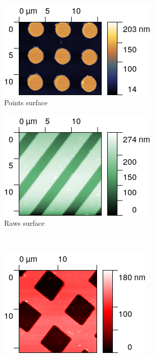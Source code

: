 \documentclass[11pt,a4paper]{article}
\begin{document}
\begin{figure}[H]
\centering
\begin{subfigure}[b]{0.45\textwidth}
\includegraphics[width=\textwidth]{sm_points}
\caption{Points surface}
\end{subfigure}
\begin{subfigure}[b]{0.45\textwidth}
\includegraphics[width=\textwidth]{sm_raws}
\caption{Raws surface}
\end{subfigure}\\\vspace{.2cm}
\begin{subfigure}[b]{0.45\textwidth}
\includegraphics[width=\textwidth]{sm_squares}

\end{subfigure}
\end{figure}
\end{document}
